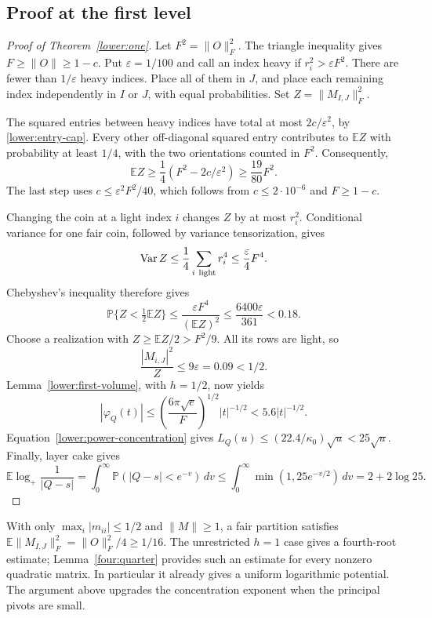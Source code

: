 \subsection{Proof at the first level}

\begin{proof}[Proof of Theorem~\ref{lower:one}]
Let $F^2=\|O\|_F^2$.  The triangle inequality gives
$F\geq\|O\|\geq1-c$.  Put $\varepsilon=1/100$ and call an
index heavy if $r_i^2>\varepsilon F^2$.  There are fewer than
$1/\varepsilon$ heavy indices.  Place all of them in $J$, and place
each remaining index independently in $I$ or $J$, with equal
probabilities.  Set $Z=\|M_{I,J}\|_F^2$.

The squared entries between heavy indices have total at most
$2c/\varepsilon^2$, by \eqref{lower:entry-cap}.  Every other
off-diagonal squared entry contributes to $\mathbb EZ$ with
probability at least $1/4$, with the two orientations counted in
$F^2$.  Consequently,
\[
 \mathbb EZ\geq\frac14(F^2-2c/\varepsilon^2)
          \geq\frac{19}{80}F^2.
\]
The last step uses $c\leq\varepsilon^2F^2/40$, which follows from
$c\leq2\cdot10^{-6}$ and $F\geq1-c$.

Changing the coin at a light index $i$ changes $Z$ by at most
$r_i^2$.  Conditional variance for one fair coin, followed by
variance tensorization, gives
\[
 \operatorname{Var}Z
 \leq\frac14\sum_{i\ {\rm light}}r_i^4
 \leq\frac\varepsilon4F^4.
\]
Chebyshev's inequality therefore gives
\[
 \mathbb P\{Z<\tfrac12\mathbb EZ\}
 \leq\frac{\varepsilon F^4}{(\mathbb EZ)^2}
 \leq\frac{6400\varepsilon}{361}<0.18.
\]
Choose a realization with $Z\geq\mathbb EZ/2>F^2/9$.
All its rows are light, so
\[
 \frac{|M_{i,J}|^2}{Z}\leq9\varepsilon=0.09<1/2.
\]
Lemma~\ref{lower:first-volume}, with $h=1/2$, now yields
\[
 |\varphi_Q(t)|
 \leq\left(\frac{6\pi\sqrt e}{F}\right)^{1/2}|t|^{-1/2}
 <5.6|t|^{-1/2}.
\]
Equation~\eqref{lower:power-concentration} gives
$L_Q(u)\leq(22.4/\kappa_0)\sqrt u<25\sqrt u$.
Finally, layer cake gives
\[
 \mathbb E\log_+\frac1{|Q-s|}
 =\int_0^\infty\mathbb P(|Q-s|<e^{-v})\,dv
 \leq\int_0^\infty\min(1,25e^{-v/2})\,dv
 =2+2\log25.
\]
\end{proof}

With only $\max_i|m_{ii}|\leq1/2$ and $\|M\|\geq1$, a fair
partition satisfies $\mathbb E\|M_{I,J}\|_F^2=\|O\|_F^2/4\geq1/16$.
The unrestricted $h=1$ case gives a fourth-root estimate;
Lemma~\ref{four:quarter} provides such an estimate for every nonzero
quadratic matrix.  In particular it already gives a
uniform logarithmic potential.  The argument above upgrades the
concentration exponent when the principal pivots are small.

